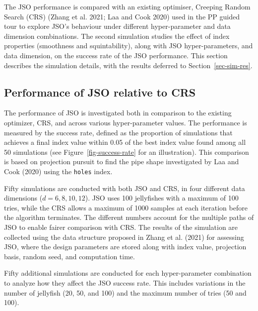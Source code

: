 \documentclass[
  12pt,
]{interact}
\theoremstyle{plain}
\begin{document}
The JSO performance is compared with an existing optimiser, Creeping
Random Search (CRS) (Zhang et al. 2021; Laa and Cook 2020) used in the
PP guided tour to explore JSO's behaviour under different
hyper-parameter and data dimension combinations. The second simulation
studies the effect of index properties (smoothness and squintability),
along with JSO hyper-parameters, and data dimension, on the success rate
of the JSO performance. This section describes the simulation details,
with the results deferred to Section~\ref{sec-sim-res}.

\hypertarget{sec-app-1}{%
\subsection{Performance of JSO relative to CRS}\label{sec-app-1}}

The performance of JSO is investigated both in comparison to the
existing optimizer, CRS, and across various hyper-parameter values. The
performance is measured by the success rate, defined as the proportion
of simulations that achieves a final index value within 0.05 of the best
index value found among all 50 simulations (see
Figure~\ref{fig-success-rate} for an illustration). This comparison is
based on projection pursuit to find the pipe shape investigated by Laa
and Cook (2020) using the \texttt{holes} index.

Fifty simulations are conducted with both JSO and CRS, in four different
data dimensions (\(d = 6, 8, 10, 12\)). JSO uses 100 jellyfishes with a
maximum of 100 tries, while the CRS allows a maximum of 1000 samples at
each iteration before the algorithm terminates. The different numbers
account for the multiple paths of JSO to enable fairer comparison with
CRS. The results of the simulation are collected using the data
structure proposed in Zhang et al. (2021) for assessing JSO, where the
design parameters are stored along with index value, projection basis,
random seed, and computation time.

Fifty additional simulations are conducted for each hyper-parameter
combination to analyze how they affect the JSO success rate. This
includes variations in the number of jellyfish (20, 50, and 100) and the
maximum number of tries (50 and 100).
\end{document}

